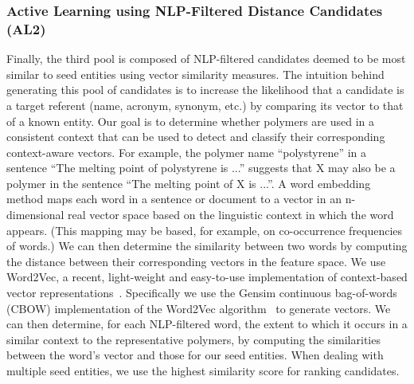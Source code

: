 \subsubsection{Active Learning using NLP-Filtered Distance Candidates (AL2)}
Finally, the third pool is composed of NLP-filtered candidates deemed to be most similar to seed entities using vector similarity measures.
The intuition behind generating this pool of candidates is to increase the likelihood that a candidate is a target referent (name, acronym, synonym, etc.) by comparing its vector to that of a known entity.
Our goal is to determine whether polymers are used in a consistent context that can be used to detect and classify their corresponding context-aware vectors.
For example, the polymer name ``polystyrene'' in a sentence ``The
melting point of polystyrene is ...'' suggests that X may also be a polymer in the
sentence ``The melting point of X is ...''.
A word embedding method maps each word
in a sentence or document to a vector in an n-dimensional real vector space
based on the linguistic context in which the word appears. (This mapping may
be based, for example, on co-occurrence frequencies of words.) 
We can then
determine the similarity between two words by computing the distance between
their corresponding vectors in the feature space.
We use Word2Vec, a recent, light-weight and easy-to-use implementation of context-based vector representations~\cite{mikolov2013efficient,mikolov2013distributed}.
Specifically we use the Gensim continuous bag-of-words
(CBOW) implementation of the Word2Vec
algorithm~\cite{rehurek2010software} to generate vectors.
We can then determine, for each NLP-filtered word, the extent to which it occurs
in a similar context to the representative polymers, by computing the similarities
between the word's vector and those for our seed entities. 
When dealing with multiple seed entities, we use the highest similarity score for ranking candidates.


